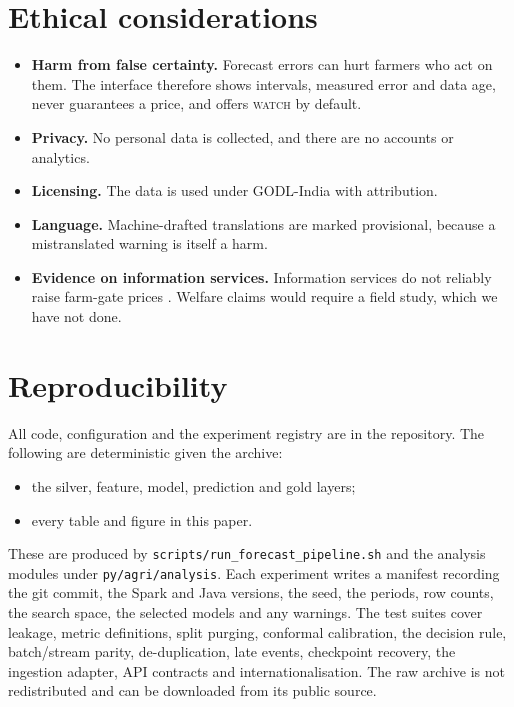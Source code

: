 \section{Ethical considerations}\label{sec:ethics}
\begin{itemize}
  \item \textbf{Harm from false certainty.} Forecast errors can hurt farmers who act on them. The interface therefore shows intervals, measured error and data age, never guarantees a price, and offers \textsc{watch} by default.
  \item \textbf{Privacy.} No personal data is collected, and there are no accounts or analytics.
  \item \textbf{Licensing.} The data is used under GODL-India with attribution.
  \item \textbf{Language.} Machine-drafted translations are marked provisional, because a mistranslated warning is itself a harm.
  \item \textbf{Evidence on information services.} Information services do not reliably raise farm-gate prices \cite{fafchamps2012sms,mitra2018asymmetric}. Welfare claims would require a field study, which we have not done.
\end{itemize}

\section{Reproducibility}\label{sec:repro}
All code, configuration and the experiment registry are in the repository.
The following are deterministic given the archive:
\begin{itemize}
  \item the silver, feature, model, prediction and gold layers;
  \item every table and figure in this paper.
\end{itemize}
These are produced by \texttt{scripts/run\_forecast\_pipeline.sh} and the analysis modules under \texttt{py/agri/analysis}.
Each experiment writes a manifest recording the git commit, the Spark and Java versions, the seed, the periods, row counts, the search space, the selected models and any warnings.
The test suites cover leakage, metric definitions, split purging, conformal calibration, the decision rule, batch/stream parity, de-duplication, late events, checkpoint recovery, the ingestion adapter, API contracts and internationalisation.
The raw archive is not redistributed and can be downloaded from its public source.
